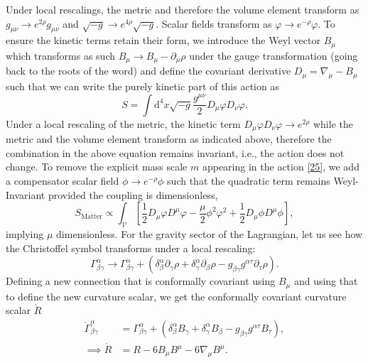 \documentclass[aps,prd,reprint,preprintnumbers,showpacs,floatfix,nofootinbib,superscript address]{revtex4-2}
\begin{document}
Under local rescalings, the metric and therefore the volume element transform as $g_{\mu\nu} \rightarrow e^{2\rho} g_{\mu\nu} $ and $\sqrt{-g} \rightarrow e^{4\rho} \sqrt{-g}$. Scalar fields transform as $\varphi \rightarrow e^{-\rho}\varphi$. To ensure the kinetic terms retain their form, we introduce the Weyl vector $B_\mu$ which transforms as such $B_{\mu} \rightarrow B_\mu - \partial_\mu \rho$ under the gauge transformation (going back to the roots of the word) and define the covariant derivative $D_\mu = \nabla_\mu - B_\mu$ such that we can write the purely kinetic part of this action as
\begin{equation}
    S = \int \text{d}^4 x \sqrt{-g} \frac{g^{\mu\nu}}{2} D_\mu \varphi D_\nu \varphi   .
\end{equation}
Under a local rescaling of the metric, the kinetic term $D_\mu \varphi D_\nu \varphi \rightarrow e^{2\rho}$ while the metric and the volume element transform as indicated above, therefore the combination in the above equation remains invariant, i.e., the action does not change. To remove the explicit mass scale $m$ appearing in the action \cref{25}, we add a compensator scalar field $\phi \rightarrow e^{-\rho}\phi$ such that the quadratic term remains Weyl-Invariant provided the coupling is dimensionless,
\begin{equation}
    S_\text{Matter} \propto \int_\mathcal{V} \left[\frac{1}{2} D_\mu \varphi D^\mu \varphi - \frac{\mu}{2} \phi^2 \varphi^2 + \frac{1}{2} D_\mu \phi D^\mu \phi \right] ,
\end{equation}
implying $\mu$ dimensionless. For the gravity sector of the Lagrangian, let us see how the Christoffel symbol transforms under a local rescaling:
\begin{equation}
    \Gamma^{\alpha}_{\beta \gamma} \rightarrow \Gamma^{\alpha}_{\beta \gamma} +(\delta^{\alpha}_{\beta} \partial_\gamma \rho + \delta^{\alpha}_{\gamma} \partial_{\beta} \rho - g_{\beta \gamma}g^{\alpha \tau}\partial_{\tau}\rho) .
\end{equation}
Defining a new connection that is conformally covariant using $B_\mu$ and using that to define the new curvature scalar, we get the conformally covariant curvature scalar $\mathring{R}$
\begin{align}
    \mathring{\Gamma}^{\alpha}_{\beta \gamma} &= \Gamma^{\alpha}_{\beta \gamma} + (\delta^{\alpha}_{\beta} B_{\gamma} + \delta^{\alpha}_{\gamma} B_{\beta} - g_{\beta \gamma}g^{\alpha \tau}B_{\tau}), \\
    \implies \mathring{R} &= R - 6 B_{\mu} B^{\mu} - 6 \nabla_\mu B^\mu .
\end{align}
\end{document}
